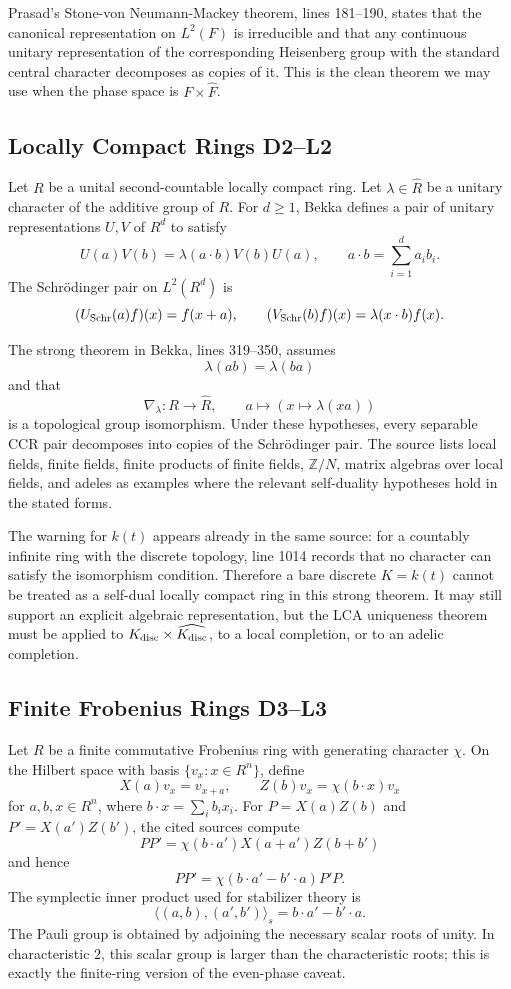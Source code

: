 Prasad's Stone-von Neumann-Mackey theorem, lines 181--190, states that the
canonical representation on \(L^2(F)\) is irreducible and that any continuous
unitary representation of the corresponding Heisenberg group with the standard
central character decomposes as copies of it.  This is the clean theorem we
may use when the phase space is \(F\times\widehat F\).

\subsection{Locally Compact Rings D2--L2}

Let \(R\) be a unital second-countable locally compact ring.  Let
\(\lambda\in\widehat R\) be a unitary character of the additive group of \(R\).
For \(d\ge1\), Bekka defines a pair of unitary representations \(U,V\) of
\(R^d\) to satisfy
\[
  U(a)V(b)=\lambda(a\cdot b)V(b)U(a),\qquad
  a\cdot b=\sum_{i=1}^d a_i b_i .
\]
The Schrödinger pair on \(L^2(R^d)\) is
\[
  (U_{\rm Schr}(a)f)(x)=f(x+a),\qquad
  (V_{\rm Schr}(b)f)(x)=\lambda(x\cdot b)f(x).
\]

The strong theorem in Bekka, lines 319--350, assumes
\[
  \lambda(ab)=\lambda(ba)
\]
and that
\[
  \nabla_\lambda:R\longrightarrow\widehat R,\qquad
  a\longmapsto(x\mapsto\lambda(xa))
\]
is a topological group isomorphism.  Under these hypotheses, every separable
CCR pair decomposes into copies of the Schrödinger pair.  The source lists
local fields, finite fields, finite products of finite fields, \(\mathbb Z/N\),
matrix algebras over local fields, and adeles as examples where the relevant
self-duality hypotheses hold in the stated forms.

The warning for \(k(t)\) appears already in the same source: for a countably
infinite ring with the discrete topology, line 1014 records that no character
can satisfy the isomorphism condition.  Therefore a bare discrete
\(K=k(t)\) cannot be treated as a self-dual locally compact ring in this
strong theorem.  It may still support an explicit algebraic representation,
but the LCA uniqueness theorem must be applied to \(K_{\rm disc}\times
\widehat{K_{\rm disc}}\), to a local completion, or to an adelic completion.

\subsection{Finite Frobenius Rings D3--L3}

Let \(R\) be a finite commutative Frobenius ring with generating character
\(\chi\).  On the Hilbert space with basis \(\{v_x:x\in R^n\}\), define
\[
  X(a)v_x=v_{x+a},\qquad Z(b)v_x=\chi(b\cdot x)v_x
\]
for \(a,b,x\in R^n\), where \(b\cdot x=\sum_i b_i x_i\).  For \(P=X(a)Z(b)\) and
\(P'=X(a')Z(b')\), the cited sources compute
\[
  PP'=\chi(b\cdot a')X(a+a')Z(b+b')
\]
and hence
\[
  PP'=\chi(b\cdot a'-b'\cdot a)P'P.
\]
The symplectic inner product used for stabilizer theory is
\[
  \langle(a,b),(a',b')\rangle_s=b\cdot a'-b'\cdot a.
\]
The Pauli group is obtained by adjoining the necessary scalar roots of unity.
In characteristic \(2\), this scalar group is larger than the characteristic
roots; this is exactly the finite-ring version of the even-phase caveat.

